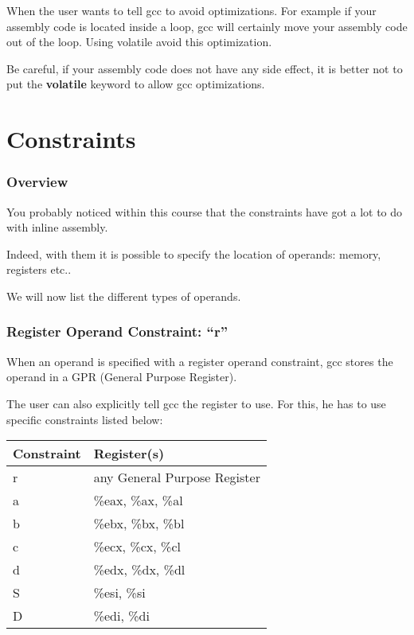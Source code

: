 {\begin{frame}
  \nl

  When the user wants to tell gcc to avoid optimizations.
  For example if your assembly code is located inside a loop, gcc
  will certainly move your assembly code out of the loop.
  Using volatile avoid this optimization.

  \nl

  Be careful, if your assembly code does not have any side effect,
  it is better not to put the \textbf{volatile} keyword to allow gcc
  optimizations.
\end{frame}

%
%

\section{Constraints}


\begin{frame}
  \frametitle{Overview}

  You probably noticed within this course that the constraints have got
  a lot to do with inline assembly.

  \nl

  Indeed, with them it is possible to specify the location of
  operands: memory, registers etc..

  \nl

  We will now list the different types of operands.
\end{frame}


\begin{frame}
  \frametitle{Register Operand Constraint: \textbf{``r''}}

  When an operand is specified with a register operand constraint,
  gcc stores the operand in a GPR (General Purpose Register).

  \nl

  The user can also explicitly tell gcc the register to use. For this,
  he has to use specific constraints listed below:

  \begin{center}

  \begin{tabular}{|p{2cm}|p{4cm}|}
    \hline
    \textbf{Constraint} & \textbf{Register(s)} \\
    \hline
    r & any General Purpose Register \\
    \hline
    a & \%eax, \%ax, \%al \\
    \hline
    b & \%ebx, \%bx, \%bl \\
    \hline
    c & \%ecx, \%cx, \%cl \\
    \hline
    d & \%edx, \%dx, \%dl \\
    \hline
    S & \%esi, \%si \\
    \hline
    D & \%edi, \%di \\
    \hline
  \end{tabular}


\end{center}
\end{frame}}
